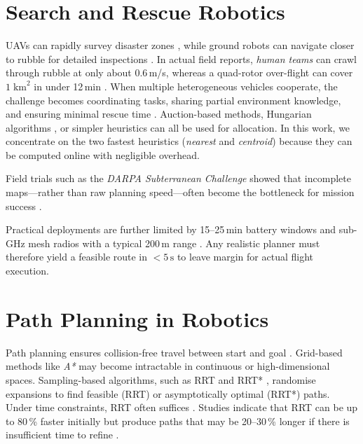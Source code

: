 \documentclass[12pt,a4paper]{report}
\begin{document}
\section{Search and Rescue Robotics}
\label{sec:search_rescue_robotics}

UAVs can rapidly survey disaster zones \cite{Daud2022DroneDisaster}, while ground robots can navigate
closer to rubble for detailed inspections \cite{Erdelj2017MultiUAV}. 
In actual field reports, \textit{human teams} can crawl through rubble at only about 
0.6\,m/s, whereas a quad-rotor over-flight can cover $1\;\text{km}^2$ in under 
12\,min \cite{Murphy2014DisasterRobotics}. 
When multiple heterogeneous vehicles cooperate, the challenge becomes coordinating tasks, 
sharing partial environment knowledge, and ensuring minimal rescue time \cite{Gerkey2004Taxonomy}. 
Auction-based methods, Hungarian algorithms \cite{Liu2012FlexibleAssignment}, or simpler heuristics 
can all be used for allocation. In this work, we concentrate on the two fastest heuristics 
(\emph{nearest} and \emph{centroid}) because they can be computed online with negligible overhead.

Field trials such as the \emph{DARPA Subterranean Challenge} showed that incomplete 
maps—rather than raw planning speed—often become the bottleneck for mission success 
\cite{Hoffman2021SubTChallenge}.  

\vspace{0.8em}
\noindent
Practical deployments are further limited by 15–25\,min battery windows and 
sub-GHz mesh radios with a typical 200\,m range \cite{DroneBattery2023}. 
Any realistic planner must therefore yield a feasible route in $<\!5\,\text{s}$ 
to leave margin for actual flight execution.

\section{Path Planning in Robotics}
\label{sec:path_planning_robotics}
Path planning ensures collision-free travel between start and goal \cite{Orthey2024SBMPReview}. 
Grid-based methods like \emph{A*} may become intractable in continuous or high-dimensional spaces. 
Sampling-based algorithms, such as RRT \cite{LaValle2001RRT} and RRT* \cite{Karaman2011RRTstar}, randomise expansions to find feasible 
(RRT) or asymptotically optimal (RRT*) paths. Under time constraints, RRT often suffices \cite{Zhang2024ShrinkingPOMCP}. 
Studies indicate that RRT can be up to 80\,\% faster initially but produce paths that may be 
20--30\,\% longer if there is insufficient time to refine \cite{Kuffner2000RRTProgress,Karaman2010RSSIncremental}.
\end{document}
